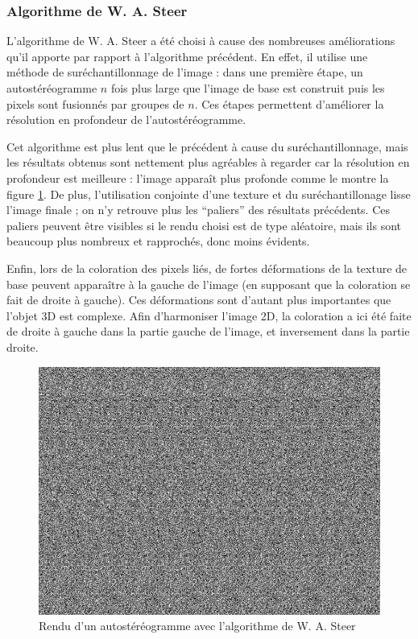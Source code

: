   \subsubsection{Algorithme de W. A. Steer}
  
  L'algorithme de W. A. Steer a été choisi à cause des nombreuses améliorations qu'il apporte par rapport à l'algorithme précédent. En effet, il utilise une méthode de suréchantillonnage de l'image : dans une première étape, un autostéréogramme $n$ fois plus large que l'image de base est construit puis les pixels sont fusionnés par groupes de $n$. Ces étapes permettent d'améliorer la résolution en profondeur de l'autostéréogramme.
  
  Cet algorithme est plus lent que le précédent à cause du suréchantillonnage, mais les résultats obtenus sont nettement plus agréables à regarder car la résolution en profondeur est meilleure : l'image apparaît plus profonde comme le montre la figure \ref{fig:autoste2}. De plus, l'utilisation conjointe d'une texture et du suréchantillonage lisse l'image finale ; on n'y retrouve plus les ``paliers'' des résultats précédents. Ces paliers peuvent être visibles si le rendu choisi est de type aléatoire, mais ils sont beaucoup plus nombreux et rapprochés, donc moins évidents.

  Enfin, lors de la coloration des pixels liés, de fortes déformations de la texture de base peuvent apparaître à la gauche de l'image (en supposant que la coloration se fait de droite à gauche). Ces déformations sont d'autant plus importantes que l'objet 3D est complexe. Afin d'harmoniser l'image 2D, la coloration a ici été faite de droite à gauche dans la partie gauche de l'image, et inversement dans la partie droite.

\begin{figure}[h]
	\centering
	\includegraphics[scale=0.3]{autoste2.png}
	\caption{\label{fig:autoste2} Rendu d'un autostéréogramme avec l'algorithme de W. A. Steer \protect}
\end{figure}
